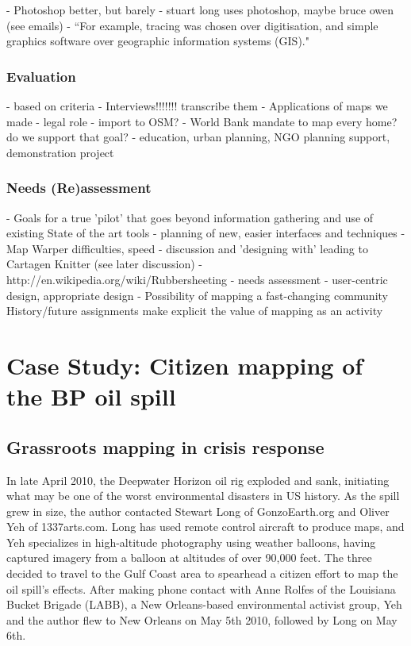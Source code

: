 \documentclass[11pt]{report}
\begin{document}
    - Photoshop better, but barely
	- stuart long uses photoshop, maybe bruce owen (see emails)
	- ``For example, tracing was chosen over digitisation, and simple graphics software over geographic information systems (GIS)." \cite{poole2006there}
\subsection{Evaluation}
- based on criteria
        - Interviews!!!!!!! transcribe them
        - Applications of maps we made
            - legal role
            - import to OSM?
            - World Bank mandate to map every home? do we support that goal?
            - education, urban planning, NGO planning support, demonstration project
\subsection{Needs (Re)assessment}
- Goals for a true 'pilot' that goes beyond information gathering and use of existing State of the art tools
   - planning of new, easier interfaces and techniques
                - Map Warper difficulties, speed
            - discussion and 'designing with' leading to Cartagen Knitter (see later discussion)
		- http://en.wikipedia.org/wiki/Rubbersheeting
            - needs assessment - user-centric design, appropriate design
    - Possibility of mapping a fast-changing community
        History/future assignments make explicit the value of mapping as an activity

\chapter{Case Study: Citizen mapping of the BP oil spill}
\section{Grassroots mapping in crisis response}

In late April 2010, the Deepwater Horizon oil rig exploded and sank, initiating what may be one of the worst environmental disasters in US history. As the spill grew in size, the author contacted Stewart Long of GonzoEarth.org and Oliver Yeh of 1337arts.com. Long has used remote control aircraft to produce maps, and Yeh specializes in high-altitude photography using weather balloons, having captured imagery from a balloon at altitudes of over 90,000 feet. The three decided to travel to the Gulf Coast area to spearhead a citizen effort to map the oil spill's effects. After making phone contact with Anne Rolfes of the Louisiana Bucket Brigade (LABB), a New Orleans-based environmental activist group, Yeh and the author flew to New Orleans on May 5th 2010, followed by Long on May 6th. 
\end{document}

